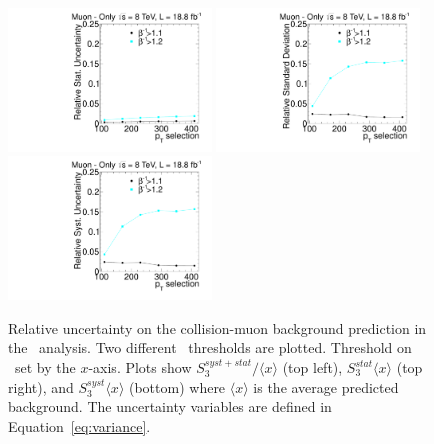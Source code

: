 \begin{figure}
\begin{center}
\includegraphics[clip=false, trim=0.0cm 0cm 0.0cm 0cm, width=0.48\textwidth]{figures/muonly/Data8TeVCollisionStat}
\includegraphics[clip=false, trim=0.0cm 0cm 0.0cm 0cm, width=0.48\textwidth]{figures/muonly/Data8TeVCollisionStatSyst} \\
\includegraphics[clip=false, trim=0.0cm 0cm 0.0cm 0cm, width=0.48\textwidth]{figures/muonly/Data8TeVCollisionSyst}
\caption[Statistical and systematic uncertainties in the background prediction for different sets of thresholds in the \muononly\ analysis.]
{Relative uncertainty on the collision-muon background prediction in the \muononly\ analysis.
Two different \invbeta\ thresholds are plotted. Threshold on \pt\ set by the $x$-axis.
Plots show $S^{syst+stat}_{3}/\langle x \rangle$ (top left), $S^{stat}_{3}\langle x \rangle$ (top right), and $S^{syst}_{3}\langle x \rangle$ (bottom)
where $\langle x \rangle$ is the average predicted background.
The uncertainty variables are defined in Equation~\ref{eq:variance}.
}
\label{fig:MuOnlyUnc}
\end{center}
\end{figure}

